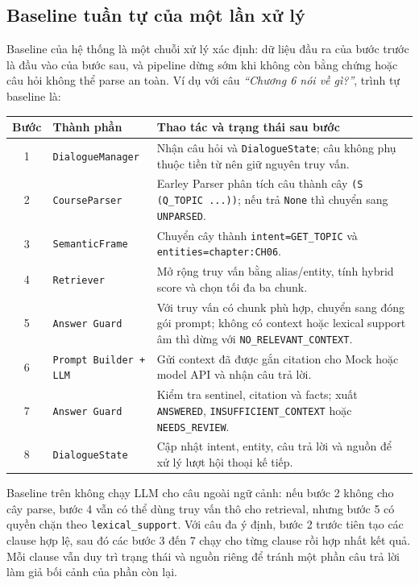\subsection{Baseline tuần tự của một lần xử lý}

Baseline của hệ thống là một chuỗi xử lý xác định: dữ liệu đầu ra của bước trước là đầu vào của bước sau, và pipeline dừng sớm khi không còn bằng chứng hoặc câu hỏi không thể parse an toàn. Ví dụ với câu \emph{“Chương 6 nói về gì?”}, trình tự baseline là:

\begin{longtable}{c p{} p{}}
\toprule
Bước & Thành phần & Thao tác và trạng thái sau bước \\
\midrule
1 & \texttt{DialogueManager} & Nhận câu hỏi và \texttt{DialogueState}; câu không phụ thuộc tiền từ nên giữ nguyên truy vấn. \\
2 & \texttt{CourseParser} & Earley Parser phân tích câu thành cây \texttt{(S (Q\_TOPIC ...))}; nếu trả \texttt{None} thì chuyển sang \texttt{UNPARSED}. \\
3 & \texttt{SemanticFrame} & Chuyển cây thành \texttt{intent=GET\_TOPIC} và \texttt{entities=chapter:CH06}. \\
4 & \texttt{Retriever} & Mở rộng truy vấn bằng alias/entity, tính hybrid score và chọn tối đa ba chunk. \\
5 & \texttt{Answer Guard} & Với truy vấn có chunk phù hợp, chuyển sang đóng gói prompt; không có context hoặc lexical support âm thì dừng với \texttt{NO\_RELEVANT\_CONTEXT}. \\
6 & \texttt{Prompt Builder + LLM} & Gửi context đã được gắn citation cho Mock hoặc model API và nhận câu trả lời. \\
7 & \texttt{Answer Guard} & Kiểm tra sentinel, citation và facts; xuất \texttt{ANSWERED}, \texttt{INSUFFICIENT\_CONTEXT} hoặc \texttt{NEEDS\_REVIEW}. \\
8 & \texttt{DialogueState} & Cập nhật intent, entity, câu trả lời và nguồn để xử lý lượt hội thoại kế tiếp. \\
\bottomrule
\end{longtable}

Baseline trên không chạy LLM cho câu ngoài ngữ cảnh: nếu bước 2 không cho cây parse, bước 4 vẫn có thể dùng truy vấn thô cho retrieval, nhưng bước 5 có quyền chặn theo \texttt{lexical\_support}. Với câu đa ý định, bước 2 trước tiên tạo các clause hợp lệ, sau đó các bước 3 đến 7 chạy cho từng clause rồi hợp nhất kết quả. Mỗi clause vẫn duy trì trạng thái và nguồn riêng để tránh một phần câu trả lời làm giả bối cảnh của phần còn lại.

